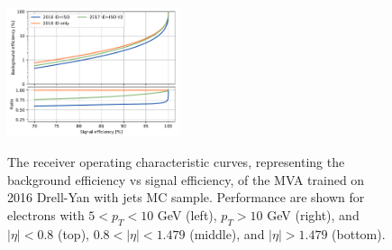 \begin{figure}[!htb]
\begin{center}
      \includegraphics[width=0.45\textwidth]{Figures/Electrons/2016_EE_10.pdf} \\
   \caption{The receiver operating characteristic curves, representing the background efficiency vs signal efficiency, of the MVA trained on 2016 Drell-Yan with
   jets MC sample. Performance are shown for electrons with $5 < p_T < 10 $ GeV (left), $p_T > 10$ GeV (right), and $|\eta| < 0.8$ (top),
   $0.8 < |\eta| < 1.479$ (middle), and $|\eta| > 1.479$ (bottom).
   \label{fig:ele_ID_ISO_ROC_2016}}
   \end{center}
\end{figure}



